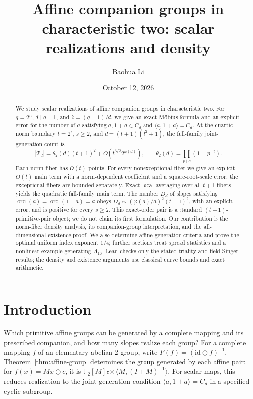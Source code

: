 \documentclass[11pt]{article}
\title{Affine companion groups in characteristic two: scalar realizations and density}
\author{Baohua Li}
\date{October 12, 2026}
\begin{document}
\maketitle
\begin{abstract}
We study scalar realizations of affine companion groups in characteristic two.
For $q=2^n$, $d\mid q-1$, and $k=(q-1)/d$, we give an exact
M\"obius formula and an explicit error for the number of $a$ satisfying
$a,1+a\in C_d$ and $\langle a,1+a\rangle=C_d$. At the quartic norm boundary
$t=2^s$, $s\ge2$, and $d=(t+1)(t^2+1)$, the full-family joint-generation
count is
\[
 |\mathcal R_d|=\theta_2(d)(t+1)^2+O(t^{3/2}2^{\omega(d)}),
 \qquad \theta_2(d)=\prod_{p\mid d}(1-p^{-2}).
\]
Each norm fiber has $O(t)$ points. For every nonexceptional fiber we give
an explicit $O(t)$ main term with a norm-dependent coefficient and a
square-root-scale error; the exceptional fibers are bounded separately.
Exact local averaging over all $t+1$ fibers yields the quadratic
full-family main term. The number $D_d$ of slopes satisfying
$\operatorname{ord}(a)=\operatorname{ord}(1+a)=d$ obeys
$D_d\sim(\varphi(d)/d)^2(t+1)^2$, with an explicit error, and is positive
for every $s\ge2$. This exact-order pair is a standard
$(t-1)$-primitive-pair object; we do not claim its first formulation.
Our contribution is the norm-fiber density analysis, its companion-group
interpretation, and the all-dimensional existence proof.
We also determine affine generation criteria and prove the optimal uniform
index exponent $1/4$; further sections treat spread statistics and a
nonlinear example generating $A_{16}$. Lean checks only the stated triality
and field-Singer results; the density and existence arguments use classical
curve bounds and exact arithmetic.
\end{abstract}

\section{Introduction}\label{sec:intro}
Which primitive affine groups can be generated by a complete mapping
and its prescribed companion, and how many slopes realize each group?
For a complete mapping $f$ of an elementary abelian $2$-group, write
$F(f)=(\mathrm{id}\oplus f)^{-1}$. Theorem~\ref{thm:affine-group}
determines the group generated by each affine pair:
for $f(x)=Mx\oplus c$, it is
$\mathbb F_2[M]c\rtimes\langle M,(I+M)^{-1}\rangle$.
For scalar maps, this reduces realization to the joint generation
condition $\langle a,1+a\rangle=C_d$ in a specified cyclic subgroup.
\end{document}
